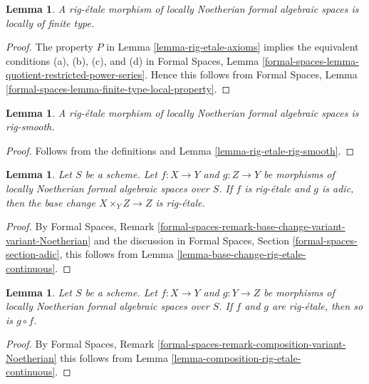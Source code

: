 \documentclass{stacks-project}
\theoremstyle{plain}
\newtheorem{lemma}[subsection]{Lemma}
\theoremstyle{definition}
\theoremstyle{remark}
\numberwithin{equation}{subsection}
\begin{document}
\begin{lemma}
\label{lemma-rig-etale-finite-type}
A rig-\'etale morphism of locally Noetherian formal algebraic spaces
is locally of finite type.
\end{lemma}

\begin{proof}
The property $P$ in Lemma \ref{lemma-rig-etale-axioms}
implies the equivalent conditions (a), (b), (c), and (d) in
Formal Spaces, Lemma
\ref{formal-spaces-lemma-quotient-restricted-power-series}.
Hence this follows from
Formal Spaces, Lemma \ref{formal-spaces-lemma-finite-type-local-property}.
\end{proof}

\begin{lemma}
\label{lemma-rig-etale-rig-smooth-morphism}
A rig-\'etale morphism of locally Noetherian formal algebraic spaces
is rig-smooth.
\end{lemma}

\begin{proof}
Follows from the definitions and
Lemma \ref{lemma-rig-etale-rig-smooth}.
\end{proof}

\begin{lemma}
\label{lemma-base-change-rig-etale}
Let $S$ be a scheme. Let $f : X \to Y$ and $g : Z \to Y$
be morphisms of locally Noetherian formal algebraic spaces over $S$.
If $f$ is rig-\'etale and $g$ is adic, then the base change
$X \times_Y Z \to Z$ is rig-\'etale.
\end{lemma}

\begin{proof}
By Formal Spaces, Remark
\ref{formal-spaces-remark-base-change-variant-variant-Noetherian}
and the discussion in Formal Spaces, Section
\ref{formal-spaces-section-adic},
this follows from Lemma \ref{lemma-base-change-rig-etale-continuous}.
\end{proof}

\begin{lemma}
\label{lemma-composition-rig-etale}
Let $S$ be a scheme. Let $f : X \to Y$ and $g : Y \to Z$
be morphisms of locally Noetherian formal algebraic spaces over $S$.
If $f$ and $g$ are rig-\'etale, then so is $g \circ f$.
\end{lemma}

\begin{proof}
By Formal Spaces, Remark
\ref{formal-spaces-remark-composition-variant-Noetherian}
this follows from Lemma \ref{lemma-composition-rig-etale-continuous}.
\end{proof}
\end{document}
